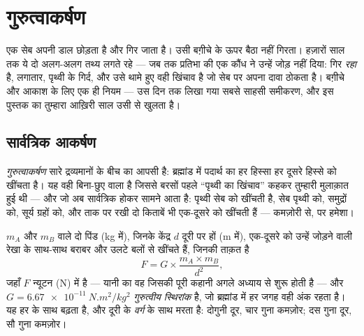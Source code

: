 \chapter{गुरुत्वाकर्षण}\label{ch:g9:gravitation}

एक सेब अपनी डाल छोड़ता है और गिर जाता है। उसी बग़ीचे के ऊपर बैठा
 नहीं गिरता। हज़ारों साल तक ये दो अलग-अलग तथ्य लगते रहे --- जब
तक प्रतिभा की एक कौंध ने उन्हें जोड़ नहीं दिया:  गिर \emph{रहा}
है, लगातार, पृथ्वी के गिर्द, और उसे थामे हुए वही खिंचाव है जो सेब पर
अपना दावा ठोकता है। बग़ीचे और आकाश के लिए एक ही नियम --- उस दिन तक लिखा
गया सबसे साहसी समीकरण, और इस पुस्तक का तुम्हारा आख़िरी साल उसी से खुलता
है।

\section{सार्वत्रिक आकर्षण}

\begin{definition}[गुरुत्वाकर्षण]\label{def:g9:gravitation:gravitation}
\emph{गुरुत्वाकर्षण} सारे द्रव्यमानों के बीच का
आपसी  है: ब्रह्मांड में पदार्थ का हर हिस्सा हर दूसरे हिस्से को
खींचता है। यह वही बिना-छुए वाला  है जिससे बरसों पहले ``पृथ्वी का
खिंचाव'' कहकर तुम्हारी मुलाक़ात हुई थी --- और जो अब सार्वत्रिक होकर
सामने आता है: पृथ्वी सेब को खींचती है, सेब पृथ्वी को,  समुद्रों
को, सूर्य ग्रहों को, और ताक पर रखी दो किताबें भी एक-दूसरे को खींचती हैं
--- कमज़ोरी से, पर हमेशा।
\end{definition}

\begin{proposition}[सार्वत्रिक गुरुत्वाकर्षण का नियम]\label{prop:g9:gravitation:law}
$m_A$ और $m_B$  वाले दो पिंड (\unit{kg} में), जिनके केंद्र
$d$ दूरी पर हों (\unit{m} में), एक-दूसरे को उन्हें जोड़ने वाली रेखा के
साथ-साथ बराबर और उलटे बलों से खींचते हैं, जिनकी ताक़त है
\[
F = G \times \frac{m_A \times m_B}{d^2},
\]
जहाँ $F$ न्यूटन (\unit{N}) में है --- यानी  का वह  जिसकी पूरी
कहानी अगले अध्याय से शुरू होती है --- और
$G = \qty{6.67e-11}{N.m^2/kg^2}$ \emph{गुरुत्वीय स्थिरांक} है, जो
ब्रह्मांड में हर जगह वही अंक रहता है। यह  हर  के साथ बढ़ता
है, और दूरी के \emph{वर्ग} के साथ मरता है: दोगुनी दूर, चार गुना
कमज़ोर; दस गुना दूर, सौ गुना कमज़ोर।
\end{proposition}


